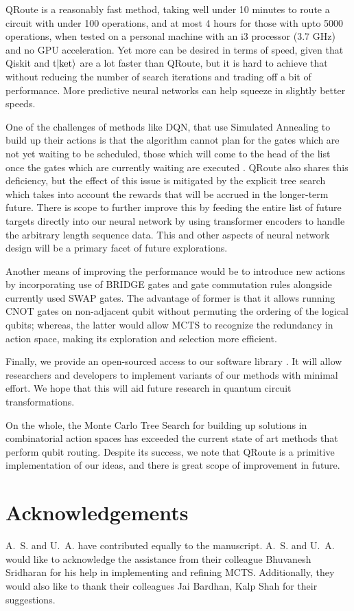 \documentclass[%
 reprint,
amsmath,amssymb,showkeys,
pra,
]{revtex4-2}
\begin{document}
QRoute is a reasonably fast method, taking well under 10 minutes to route a circuit with under 100 operations, and at most 4 hours for those with upto 5000 operations, when tested on a personal machine with an i3 processor (3.7 GHz) and no GPU acceleration. Yet more can be desired in terms of speed, given that Qiskit and t$\ket{\text{ket}}$ are a lot faster than QRoute, but it is hard to achieve that without reducing the number of search iterations and trading off a bit of performance. More predictive neural networks can help squeeze in slightly better speeds.

One of the challenges of methods like DQN, that use Simulated Annealing to build up their actions is that the algorithm cannot plan for the gates which are not yet waiting to be scheduled, those which will come to the head of the list once the gates which are currently waiting are executed \citep{qroute_dqn2}. QRoute also shares this deficiency, but the effect of this issue is mitigated by the explicit tree search which takes into account the rewards that will be accrued in the longer-term future. There is scope to further improve this by feeding the entire list of future targets directly into our neural network by using transformer encoders to handle the arbitrary length sequence data. This and other aspects of neural network design will be a primary facet of future explorations. %

Another means of improving the performance  would be to introduce new actions by incorporating use of BRIDGE gates \citep{bridge_gate} and gate commutation rules \citep{utk_equiv_circuits} alongside currently used SWAP gates. The advantage of former is that it allows running CNOT gates on non-adjacent qubit without permuting the ordering of the logical qubits; whereas, the latter would allow MCTS to recognize the redundancy in action space, making its exploration and selection more efficient.

Finally, we provide an open-sourced access to our software library \citep{codebase}. It will allow researchers and developers to implement variants of our methods with minimal effort. We hope that this will aid future research in quantum circuit transformations.

On the whole, the Monte Carlo Tree Search for building up solutions in combinatorial action spaces has exceeded the current state of art methods that perform qubit routing. Despite its success, we note that QRoute is a primitive implementation of our ideas, and there is great scope of improvement in future. 

\section*{Acknowledgements}
A.~S. and U.~A. have contributed equally to the manuscript. A.~S. and U.~A. would like to acknowledge the assistance from their colleague Bhuvanesh Sridharan for his help in implementing and refining MCTS. Additionally, they would also like to thank their colleagues Jai Bardhan, Kalp Shah for their suggestions.


%


\end{document}
